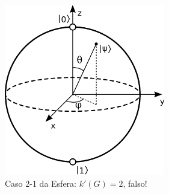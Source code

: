 \begin{figure}[htb]	
\center%
\includegraphics[width=7cm]{./img/EsferaBloch.png}
\caption{Caso 2-1 da Esfera: $k'(G)=2$, falso!}
\label{fig:labelExemplo}
\end{figure}